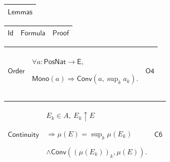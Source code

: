 \documentclass[11pt]{amsart}
\renewcommand{\arraystretch}{1.4}
\newlength{\FTCOneColumnBody}
\newlength{\FTCThreeColumnBody}
\begin{document}
{\centering
\renewcommand{\arraystretch}{1.4}
\par\setlength{\parskip}{0pt}\nointerlineskip
\noindent
\begin{tabular}{|@{}>{\centering\arraybackslash}m{\FTCOneColumnBody}|}\hline
$\displaystyle \textsf{Lemmas}$\\ \hline
\end{tabular}%
\par\setlength{\parskip}{0pt}\nointerlineskip
\noindent
\begin{tabular}{|@{}>{\centering\arraybackslash}m{0.251968\FTCThreeColumnBody}|>{\centering\arraybackslash}m{0.590551\FTCThreeColumnBody}|>{\centering\arraybackslash}m{0.157480\FTCThreeColumnBody}|}\hline
$\displaystyle \textsf{Id}$ & $\displaystyle \textsf{Formula}$ & $\displaystyle \textsf{Proof}$\\ \hline
\end{tabular}%
\par\setlength{\parskip}{0pt}\nointerlineskip
\noindent
\begin{tabular}{|@{}>{\centering\arraybackslash}m{0.251968\FTCThreeColumnBody}|>{\centering\arraybackslash}m{0.590551\FTCThreeColumnBody}|>{\centering\arraybackslash}m{0.157480\FTCThreeColumnBody}|}\hline
\hypertarget{lem:Order}{$\displaystyle \textsf{Order}$} & $\displaystyle \forall a:\textsf{PosNat}\to\textsf{E},$\par
$\displaystyle \textsf{Mono}(a)\Rightarrow\textsf{Conv}(a,\sup_k a_k).$ & \hyperlink{proof:O4}{$\displaystyle \textsf{O4}$}\\ \hline
\end{tabular}%
\par\setlength{\parskip}{0pt}\nointerlineskip
\noindent
\begin{tabular}{|@{}>{\centering\arraybackslash}m{0.251968\FTCThreeColumnBody}|>{\centering\arraybackslash}m{0.590551\FTCThreeColumnBody}|>{\centering\arraybackslash}m{0.157480\FTCThreeColumnBody}|}\hline
\hypertarget{lem:Continuity}{$\displaystyle \textsf{Continuity}$} & $\displaystyle E_k\in A,\ E_k\uparrow E$\par
$\displaystyle \Rightarrow\mu(E)=\sup_k\mu(E_k)$\par
$\displaystyle \land\textsf{Conv}((\mu(E_k))_k,\mu(E)).$ & \hyperlink{proof:C6}{$\displaystyle \textsf{C6}$}\\ \hline
\end{tabular}%
\par\setlength{\parskip}{0pt}\nointerlineskip
\noindent
\begin{tabular}{|@{}>{\centering\arraybackslash}m{0.251968\FTCThreeColumnBody}|>{\centering\arraybackslash}m{0.590551\FTCThreeColumnBody}|>{\centering\arraybackslash}m{0.157480\FTCThreeColumnBody}|}\hline

\end{tabular}}
\end{document}
